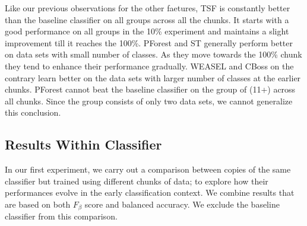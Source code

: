 Like our previous observations for the other faetures, TSF is constantly better than the baseline classifier on all groups across all the chunks.
It starts with a good performance on all groups in the 10\% experiment and maintains a slight improvement till it reaches the 100\%.
PForest and ST generally perform better on data sets with small number of classes. As they move towards the 100\% chunk they tend to enhance their performance gradually.
WEASEL and CBoss on the contrary learn better on the data sets with larger number of classes at the earlier chunks.
PForest cannot beat the baseline classifier on the group of (11+) across all chunks. Since the group consists of only two data sets, we cannot generalize this conclusion.


\subsection{Results Within Classifier}
\label{SubsectionWithinComparison}
In our first experiment, we carry out a comparison between copies of the same classifier but trained using different chunks of data;
to explore how their performances evolve in the early classification context. We combine results that are based on both $F_{\beta}$ score and balanced accuracy.
We exclude the baseline classifier from this comparison.


